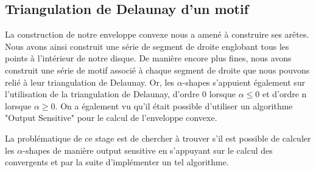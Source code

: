 \subsection{Triangulation de Delaunay d'un motif}


La construction de notre enveloppe convexe nous a amené à construire ses arêtes. Nous avons ainsi construit une série de segment de droite englobant tous les points à l'intérieur de notre disque. De manière encore plus fines, nous avons construit une série de motif associé à chaque segment de droite que nous pouvons relié à leur triangulation de Delaunay. Or, les $\alpha$-shapes s’appuient également sur l'utilisation de la triangulation de Delaunay, d'ordre 0 lorsque $\alpha \leq 0$ et d'ordre n lorsque $\alpha \geq 0$. On a également vu qu'il était possible d'utiliser un algorithme "Output Sensitive" pour le calcul de l'enveloppe convexe.

La problématique de ce stage est de chercher à trouver s'il est possible de calculer les $\alpha$-shapes de manière output sensitive en s'appuyant sur le calcul des convergents et par la suite d'implémenter un tel algorithme.  

